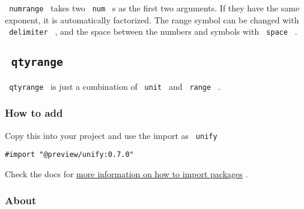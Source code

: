 \texttt{\ numrange\ } takes two \texttt{\ num\ } s as the first two
arguments. If they have the same exponent, it is automatically
factorized. The range symbol can be changed with \texttt{\ delimiter\ }
, and the space between the numbers and symbols with \texttt{\ space\ }
.

\subsection{\texorpdfstring{\texttt{\ qtyrange\ }}{ qtyrange }}\label{qtyrange}

\texttt{\ qtyrange\ } is just a combination of \texttt{\ unit\ } and
\texttt{\ range\ } .

\subsubsection{How to add}\label{how-to-add}

Copy this into your project and use the import as \texttt{\ unify\ }

\begin{verbatim}
#import "@preview/unify:0.7.0"
\end{verbatim}



Check the docs for
\href{https://typst.app/docs/reference/scripting/\#packages}{more
information on how to import packages} .

\subsubsection{About}\label{about}

